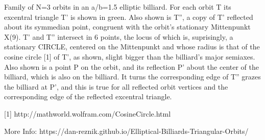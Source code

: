 Family of N=3 orbits in an a/b=1.5 elliptic billiard. For each orbit T its excentral triangle T' is shown in green. Also shown is T'', a copy of T' reflected about its symmedian point, congruent with the orbit's stationary Mittenpunkt X(9). T' and T'' intersect in 6 points, the locus of which is, suprisingly, a stationary CIRCLE, centered on the Mittenpunkt and whose radius is that of the cosine circle [1] of T', as shown, slight bigger than the billiard's major semiaxes. Also shown is a point P on the orbit, and its reflection P' about the center of the billiard, which is also on the billiard. It turns the corresponding edge of T'' grazes the billiard at P', and this is true for all reflected orbit vertices and the corresponding edge of the reflected excentral triangle.

[1] http://mathworld.wolfram.com/CosineCircle.html

More Info: https://dan-reznik.github.io/Elliptical-Billiards-Triangular-Orbits/